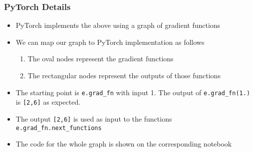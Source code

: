 \documentclass{beamer}
\theoremstyle{plain} %
\theoremstyle{example} %
\begin{document}
\begin{frame}
    \frametitle{PyTorch Details}
\begin{itemize}
    \item PyTorch implements the above using a graph of gradient functions
    \item We can map our graph to PyTorch implementation as follows
    \begin{enumerate}
        \item The oval nodes represent the gradient functions
        \item The rectangular nodes represent the outputs of those functions
    \end{enumerate}
    \item  The starting point is \lstinline{e.grad_fn} with input 1. The output of \lstinline{e.grad_fn(1.)} is \lstinline{[2,6]} as expected.
    \item The output \lstinline{[2,6]} is used as input to the functions \lstinline{e.grad_fn.next_functions}
    \item The code for the whole graph is shown on the corresponding notebook
\end{itemize}
\end{frame}
\end{document}
